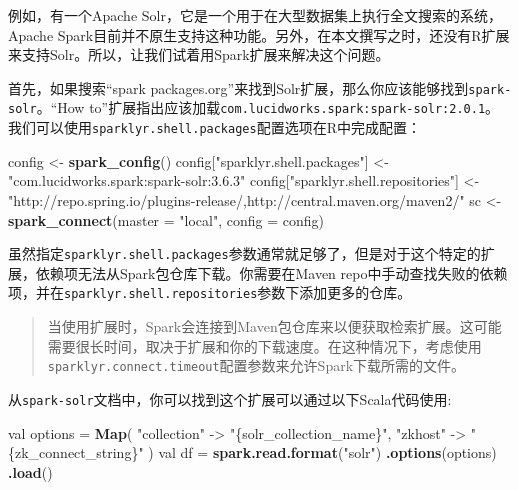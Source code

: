 \documentclass[
]{article}
\newenvironment{Shaded}{\begin{snugshade}}{\end{snugshade}}
\newcommand{\DataTypeTok}[1]{\textcolor[rgb]{0.13,0.29,0.53}{#1}}
\newcommand{\KeywordTok}[1]{\textcolor[rgb]{0.13,0.29,0.53}{\textbf{#1}}}
\newcommand{\NormalTok}[1]{#1}
\newcommand{\StringTok}[1]{\textcolor[rgb]{0.31,0.60,0.02}{#1}}
\begin{document}
例如，有一个Apache
Solr，它是一个用于在大型数据集上执行全文搜索的系统，Apache
Spark目前并不原生支持这种功能。另外，在本文撰写之时，还没有R扩展来支持Solr。所以，让我们试着用Spark扩展来解决这个问题。

首先，如果搜索``spark
packages.org''来找到Solr扩展，那么你应该能够找到\texttt{spark-solr}。``How
to''扩展指出应该加载\texttt{com.lucidworks.spark:spark-solr:2.0.1}。我们可以使用\texttt{sparklyr.shell.packages}配置选项在R中完成配置：

\begin{Shaded}
\begin{Highlighting}[]
\NormalTok{config <-}\StringTok{ }\KeywordTok{spark_config}\NormalTok{()}
\NormalTok{config[}\StringTok{"sparklyr.shell.packages"}\NormalTok{] <-}\StringTok{ "com.lucidworks.spark:spark-solr:3.6.3"}
\NormalTok{config[}\StringTok{"sparklyr.shell.repositories"}\NormalTok{] <-}\StringTok{ "http://repo.spring.io/plugins-release/,http://central.maven.org/maven2/"}
\NormalTok{sc <-}\StringTok{ }\KeywordTok{spark_connect}\NormalTok{(}\DataTypeTok{master =} \StringTok{"local"}\NormalTok{, }\DataTypeTok{config =}\NormalTok{ config)}
\end{Highlighting}
\end{Shaded}

虽然指定\texttt{sparklyr.shell.packages}参数通常就足够了，但是对于这个特定的扩展，依赖项无法从Spark包仓库下载。你需要在Maven
repo中手动查找失败的依赖项，并在\texttt{sparklyr.shell.repositories}参数下添加更多的仓库。

\begin{quote}
当使用扩展时，Spark会连接到Maven包仓库来以便获取检索扩展。这可能需要很长时间，取决于扩展和你的下载速度。在这种情况下，考虑使用\texttt{sparklyr.connect.timeout}配置参数来允许Spark下载所需的文件。
\end{quote}

从\texttt{spark-solr}文档中，你可以找到这个扩展可以通过以下Scala代码使用:

\begin{Shaded}
\begin{Highlighting}[]
\NormalTok{val options =}\StringTok{ }\KeywordTok{Map}\NormalTok{(}
\StringTok{"collection"}\NormalTok{ ->}\StringTok{ "\{solr_collection_name\}"}\NormalTok{,}
\StringTok{"zkhost"}\NormalTok{ ->}\StringTok{ "\{zk_connect_string\}"}
\NormalTok{)}
\NormalTok{val df =}\StringTok{ }\KeywordTok{spark.read.format}\NormalTok{(}\StringTok{"solr"}\NormalTok{) }\KeywordTok{.options}\NormalTok{(options) }\KeywordTok{.load}\NormalTok{()}
\end{Highlighting}
\end{Shaded}
\end{document}
